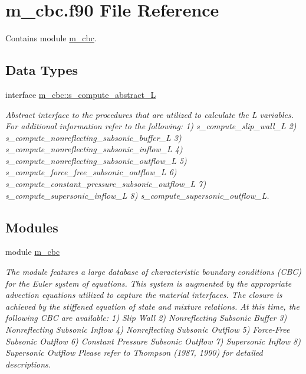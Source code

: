 \hypertarget{m__cbc_8f90}{}\section{m\+\_\+cbc.\+f90 File Reference}
\label{m__cbc_8f90}


Contains module \hyperlink{namespacem__cbc}{m\+\_\+cbc}.  


\subsection*{Data Types}
\begin{DoxyCompactItemize}
\item 
interface \hyperlink{interfacem__cbc_1_1s__compute__abstract___l}{m\+\_\+cbc\+::s\+\_\+compute\+\_\+abstract\+\_\+L}
\begin{DoxyCompactList}\small\item\em Abstract interface to the procedures that are utilized to calculate the L variables. For additional information refer to the following\+: 1) s\+\_\+compute\+\_\+slip\+\_\+wall\+\_\+L 2) s\+\_\+compute\+\_\+nonreflecting\+\_\+subsonic\+\_\+buffer\+\_\+L 3) s\+\_\+compute\+\_\+nonreflecting\+\_\+subsonic\+\_\+inflow\+\_\+L 4) s\+\_\+compute\+\_\+nonreflecting\+\_\+subsonic\+\_\+outflow\+\_\+L 5) s\+\_\+compute\+\_\+force\+\_\+free\+\_\+subsonic\+\_\+outflow\+\_\+L 6) s\+\_\+compute\+\_\+constant\+\_\+pressure\+\_\+subsonic\+\_\+outflow\+\_\+L 7) s\+\_\+compute\+\_\+supersonic\+\_\+inflow\+\_\+L 8) s\+\_\+compute\+\_\+supersonic\+\_\+outflow\+\_\+L. \end{DoxyCompactList}\end{DoxyCompactItemize}
\subsection*{Modules}
\begin{DoxyCompactItemize}
\item 
module \hyperlink{namespacem__cbc}{m\+\_\+cbc}
\begin{DoxyCompactList}\small\item\em The module features a large database of characteristic boundary conditions (C\+BC) for the Euler system of equations. This system is augmented by the appropriate advection equations utilized to capture the material interfaces. The closure is achieved by the stiffened equation of state and mixture relations. At this time, the following C\+BC are available\+: 1) Slip Wall 2) Nonreflecting Subsonic Buffer 3) Nonreflecting Subsonic Inflow 4) Nonreflecting Subsonic Outflow 5) Force-\/\+Free Subsonic Outflow 6) Constant Pressure Subsonic Outflow 7) Supersonic Inflow 8) Supersonic Outflow Please refer to Thompson (1987, 1990) for detailed descriptions. \end{DoxyCompactList}\end{DoxyCompactItemize}
